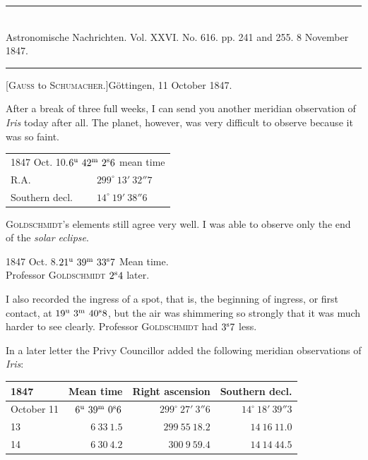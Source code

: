 \clearpage
{}
\begin{center}
\rule{0.55\linewidth}{0.4pt}\\[2pt]
Astronomische Nachrichten. Vol. XXVI. No. 616. pp. 241 and 255. 8 November 1847.\\[2pt]
\rule{0.55\linewidth}{0.4pt}
\end{center}
\begin{center}[\textsc{Gauss} to \textsc{Schumacher}.]\quad Göttingen, 11 October 1847.\end{center}

After a break of three full weeks, I can send you another meridian observation of \emph{Iris} today after all. The planet, however, was very difficult to observe because it was so faint.

\begin{center}
\begin{tabular}{ll}
\multicolumn{2}{l}{1847 Oct. 10.\quad $6^{\rm u}\ 42^{\rm m}\ 2^{\rm s}6$ mean time} \\
R.A. & $299^\circ\ 13'\ 32''7$ \\
Southern decl. & $14^\circ\ 19'\ 38''6$ \\
\end{tabular}
\end{center}

\textsc{Goldschmidt}’s elements still agree very well. I was able to observe only the end of the \emph{solar eclipse}.

\begin{center}
1847 Oct. 8.\quad $21^{\rm u}\ 39^{\rm m}\ 33^{\rm s}7$ Mean time.\\
Professor \textsc{Goldschmidt} $2^{\rm s}4$ later.
\end{center}

I also recorded the ingress of a spot, that is, the beginning of ingress, or first contact, at $19^{\rm u}\ 3^{\rm m}\ 40^{\rm s}8$, but the air was shimmering so strongly that it was much harder to see clearly. Professor \textsc{Goldschmidt} had $3^{\rm s}7$ less.

In a later letter the Privy Councillor added the following meridian observations of \emph{Iris}:

\begin{center}
\setlength{\tabcolsep}{4pt}
\begin{tabular}{l|r|r|r}
1847 & Mean time & Right ascension & Southern decl. \\\hline
October 11 & $6^{\rm u}\ 39^{\rm m}\ 0^{\rm s}6$ & $299^\circ\ 27'\ 3''6$ & $14^\circ\ 18'\ 39''3$ \\
\hfill 13 & $6\ 33\ 1.5$ & $299\ 55\ 18.2$ & $14\ 16\ 11.0$ \\
\hfill 14 & $6\ 30\ 4.2$ & $300\ 9\ 59.4$ & $14\ 14\ 44.5$ \\
\end{tabular}
\end{center}


